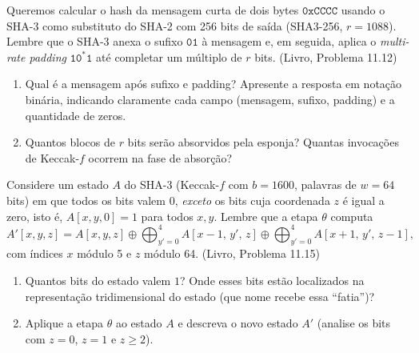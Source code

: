 \documentclass[11pt,a4paper]{article}
\newcommand{\livro}[1]{{\footnotesize\color{black!50}(Livro, Problema #1)}}
\begin{document}
\begin{exercicio}
Queremos calcular o hash da mensagem curta de dois bytes $\texttt{0xCCCC}$ usando o SHA-3 como substituto do SHA-2 com 256 bits de sa\'{i}da (SHA3-256, $r = 1088$). Lembre que o SHA-3 anexa o sufixo $\texttt{01}$ \`{a} mensagem e, em seguida, aplica o \textit{multi-rate padding} $\texttt{10}^{*}\texttt{1}$ at\'{e} completar um m\'{u}ltiplo de $r$ bits. \livro{11.12}
\begin{enumerate}[label=(\alph*)]
    \item Qual \'{e} a mensagem ap\'{o}s sufixo e padding? Apresente a resposta em nota\c{c}\~{a}o bin\'{a}ria, indicando claramente cada campo (mensagem, sufixo, padding) e a quantidade de zeros.
    \item Quantos blocos de $r$ bits ser\~{a}o absorvidos pela esponja? Quantas invoca\c{c}\~{o}es de Keccak-$f$ ocorrem na fase de absor\c{c}\~{a}o?
\end{enumerate}
\end{exercicio}

\begin{exercicio}
Considere um estado $A$ do SHA-3 (Keccak-$f$ com $b = 1600$, palavras de $w = 64$ bits) em que todos os bits valem $0$, \emph{exceto} os bits cuja coordenada $z$ \'{e} igual a zero, isto \'{e}, $A[x,y,0] = 1$ para todos $x, y$. Lembre que a etapa $\theta$ computa
\[
    A'[x,y,z] = A[x,y,z] \oplus \bigoplus_{y'=0}^{4} A[x{-}1,\,y',\,z] \oplus \bigoplus_{y'=0}^{4} A[x{+}1,\,y',\,z{-}1],
\]
com \'{i}ndices $x$ m\'{o}dulo 5 e $z$ m\'{o}dulo 64. \livro{11.15}
\begin{enumerate}[label=(\alph*)]
    \item Quantos bits do estado valem $1$? Onde esses bits est\~{a}o localizados na representa\c{c}\~{a}o tridimensional do estado (que nome recebe essa ``fatia'')?
    \item Aplique a etapa $\theta$ ao estado $A$ e descreva o novo estado $A'$ (analise os bits com $z = 0$, $z = 1$ e $z \ge 2$).
\end{enumerate}
\end{exercicio}
\end{document}
